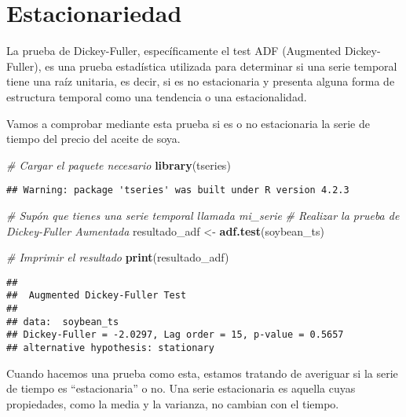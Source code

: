 \documentclass[
]{book}
\newenvironment{Shaded}{\begin{snugshade}}{\end{snugshade}}
\newcommand{\CommentTok}[1]{\textcolor[rgb]{0.56,0.35,0.01}{\textit{#1}}}
\newcommand{\FunctionTok}[1]{\textcolor[rgb]{0.13,0.29,0.53}{\textbf{#1}}}
\newcommand{\NormalTok}[1]{#1}
\newcommand{\OtherTok}[1]{\textcolor[rgb]{0.56,0.35,0.01}{#1}}
\begin{document}
\hypertarget{estacionariedad}{%
\chapter{Estacionariedad}\label{estacionariedad}}

La prueba de Dickey-Fuller, específicamente el test ADF (Augmented Dickey-Fuller), es una prueba estadística utilizada para determinar si una serie temporal tiene una raíz unitaria, es decir, si es no estacionaria y presenta alguna forma de estructura temporal como una tendencia o una estacionalidad.

Vamos a comprobar mediante esta prueba si es o no estacionaria la serie de tiempo del precio del aceite de soya.

\begin{Shaded}
\begin{Highlighting}[]
\CommentTok{\# Cargar el paquete necesario}
\FunctionTok{library}\NormalTok{(tseries)}
\end{Highlighting}
\end{Shaded}

\begin{verbatim}
## Warning: package 'tseries' was built under R version 4.2.3
\end{verbatim}

\begin{Shaded}
\begin{Highlighting}[]
\CommentTok{\# Supón que tienes una serie temporal llamada \textquotesingle{}mi\_serie\textquotesingle{}}
\CommentTok{\# Realizar la prueba de Dickey{-}Fuller Aumentada}
\NormalTok{resultado\_adf }\OtherTok{\textless{}{-}} \FunctionTok{adf.test}\NormalTok{(soybean\_ts)}

\CommentTok{\# Imprimir el resultado}
\FunctionTok{print}\NormalTok{(resultado\_adf)}
\end{Highlighting}
\end{Shaded}

\begin{verbatim}
## 
##  Augmented Dickey-Fuller Test
## 
## data:  soybean_ts
## Dickey-Fuller = -2.0297, Lag order = 15, p-value = 0.5657
## alternative hypothesis: stationary
\end{verbatim}

Cuando hacemos una prueba como esta, estamos tratando de averiguar si la serie de tiempo es ``estacionaria'' o no. Una serie estacionaria es aquella cuyas propiedades, como la media y la varianza, no cambian con el tiempo.
\end{document}
